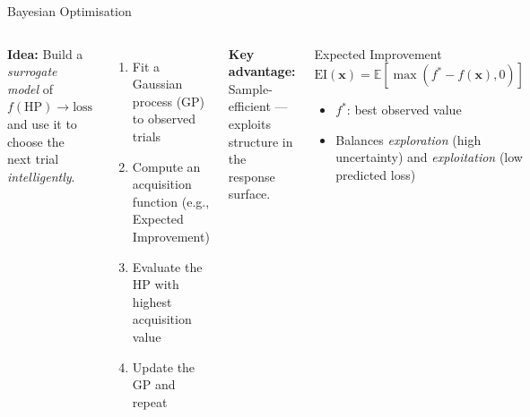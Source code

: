 \documentclass[aspectratio=169,11pt]{beamer}
\newcommand{\emphc}[1]{\textcolor{harvardcrimson}{#1}}
\newcommand{\x}{\bm{x}}
\newcommand{\E}[1]{\mathbb{E}\!\left[#1\right]}
\begin{document}
\begin{frame}{Bayesian Optimisation}
\begin{columns}[T]
\textbf{Idea:} Build a \emph{surrogate model} of $f(\text{HP}) \to \text{loss}$ and use it to choose the next trial \emph{intelligently}.

\vspace{0.3cm}
\begin{enumerate}
    \item Fit a Gaussian process (GP) to observed trials
    \item Compute an \emphc{acquisition function} (e.g., Expected Improvement)
    \item Evaluate the HP with highest acquisition value
    \item Update the GP and repeat
\end{enumerate}

\vspace{0.3cm}
\textbf{Key advantage:} \emphc{Sample-efficient} --- exploits structure in the response surface.

\begin{block}{Expected Improvement}
\vspace{-0.2cm}
\[
    \text{EI}(\x) = \E{\max(f^* - f(\x), 0)}
\]
\vspace{-0.2cm}
\begin{itemize}
    \item $f^*$: best observed value
    \item Balances \emph{exploration} (high uncertainty) and \emph{exploitation} (low predicted loss)
\end{itemize}
\end{block}
\end{columns}
\end{frame}
\end{document}
